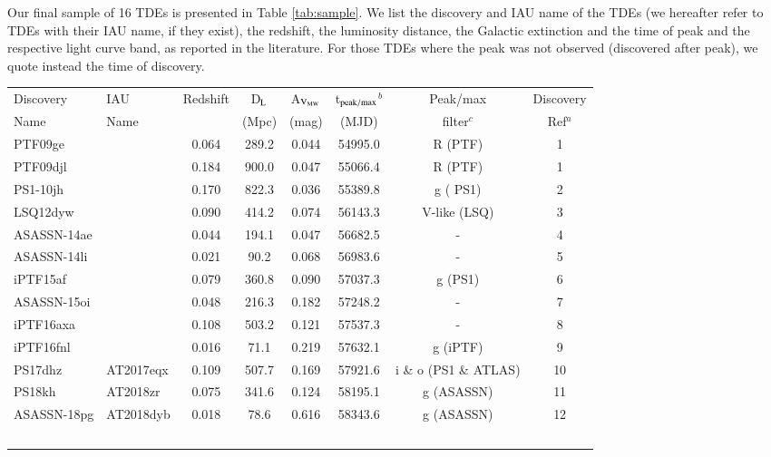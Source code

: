 \documentclass[structabstract]{aa}
\begin{document}
Our final sample of 16 TDEs is presented in Table \ref{tab:sample}. We list the discovery and IAU name of the TDEs (we hereafter refer to TDEs with their IAU name, if they exist), the redshift, the luminosity distance, the Galactic extinction \citep{Schlafly2010} and the time of peak and the respective light curve band, as reported in the literature. For those TDEs where the peak was not observed (discovered after peak), we quote instead the time of discovery.

\begin{table*}
\renewcommand{\arraystretch}{1.2}
\setlength\tabcolsep{0.36cm}
\fontsize{10}{11}\selectfont
\begin{center}
\caption{Sample presentation}\label{tab:sample}
\begin{tabular}{l l c c c c c c}
\hline
Discovery & IAU  & Redshift & D$_{\rm L}$ & A$_{\rm V_{MW}}$ & t$_{\rm peak/max}$$^{b}$ & Peak/max & Discovery \\Name & Name  & & (Mpc) & (mag) & (MJD) & filter$^{c}$ & Ref$^{a}$ \\
\hline
PTF09ge &     & 0.064  & 289.2   & 0.044  & 54995.0 &R (PTF) & 1\\
PTF09djl &      & 0.184  & 900.0   & 0.047 & 55066.4 &R (PTF) & 1\\
PS1-10jh &        & 0.170  & 822.3   & 0.036 & 55389.8 &g ( PS1) & 2\\
LSQ12dyw &           &  0.090     & 414.2   & 0.074 & 56143.3& V-like (LSQ) & 3\\
ASASSN-14ae &         & 0.044  & 194.1   & 0.047 & 56682.5&- & 4\\
ASASSN-14li &       & 0.021      & 90.2   & 0.068 & 56983.6&- & 5\\
iPTF15af &            & 0.079  & 360.8  & 0.090 & 57037.3&g (PS1) & 6\\
ASASSN-15oi &     &  0.048     & 216.3   & 0.182 & 57248.2&- & 7\\
iPTF16axa &    & 0.108      & 503.2  & 0.121 & 57537.3&- & 8\\
iPTF16fnl &     & 0.016      & 71.1   & 0.219 & 57632.1&g (iPTF) & 9\\
PS17dhz & AT2017eqx  & 0.109     & 507.7   & 0.169 & 57921.6& i \& o (PS1 \& ATLAS) & 10\\
PS18kh & AT2018zr       & 0.075  & 341.6   & 0.124 & 58195.1& g (ASASSN) & 11\\
ASASSN-18pg	 & AT2018dyb     & 0.018  & 78.6  & 0.616 & 58343.6& g (ASASSN) & 12\\
$$
\end{tabular}
\end{center}
\end{table*}
\end{document}
